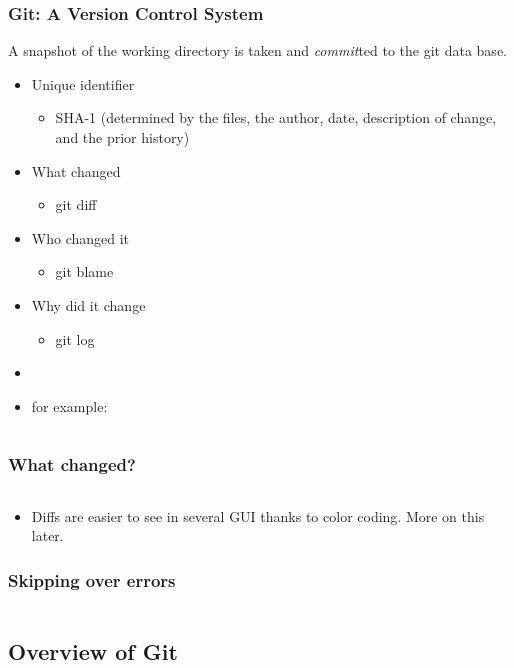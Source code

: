 \begin{frame}
  \frametitle{Git: A Version Control System}
  A snapshot of the working directory is taken and \emph{commit}ted to the git data base.
  \begin{itemize}
    \item Unique identifier
      \begin{itemize}
        \item SHA-1 (determined by the files, the author, date, description of change, and the prior history)
      \end{itemize}
    \item What changed \begin{itemize} \item  git diff \end{itemize}
    \item Who changed it \begin{itemize} \item git blame \end{itemize}
    \item Why did it change \begin{itemize} \item git log \end{itemize}
    \item[]
    \item for example:
  \end{itemize}
\end{frame}

\begin{frame}[t,fragile]
  \tiny
  \inputminted{text}{eglog.log}
\end{frame}

\begin{frame}[t,fragile]
  \frametitle{What changed?}
  \small
  \inputminted{text}{egdiff}

  \normalsize
  \begin{itemize}
    \item Diffs are easier to see in several GUI thanks to color coding. More on
      this later.
  \end{itemize}
\end{frame}

\begin{frame}[t,fragile]
  \frametitle{Skipping over errors}
  \small
  \inputminted[firstline=1,lastline=10]{text}{eglog.log}
\end{frame}

\subsection{Overview of Git}

